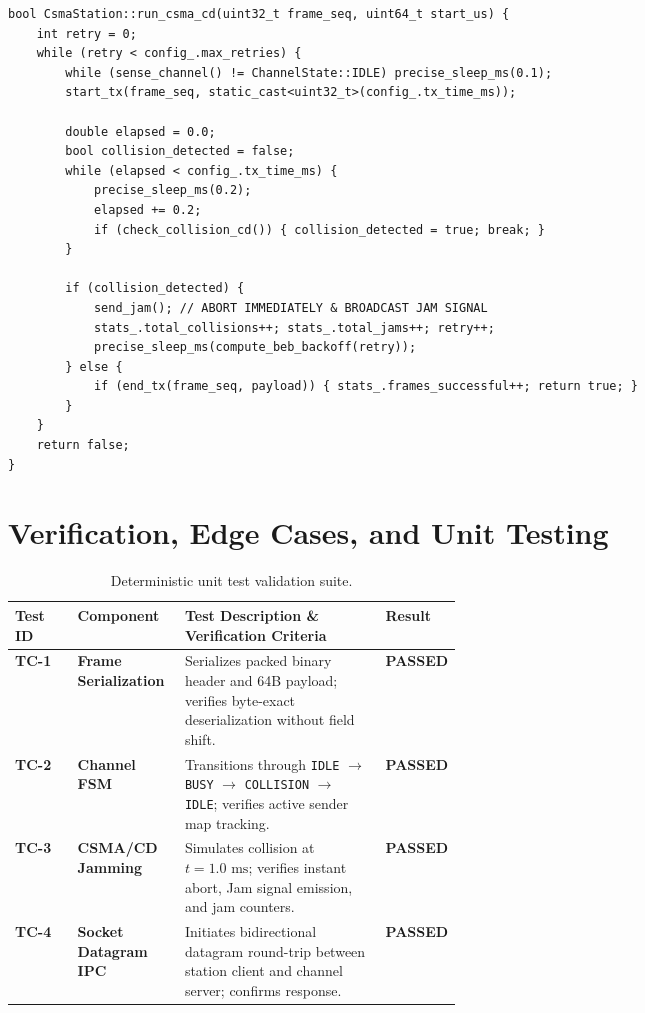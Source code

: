 \documentclass[11pt,a4paper]{article}
\begin{document}
\begin{lstlisting}[caption={CSMA/CD Listen-While-Talk abort, Jamming, and BEB in \texttt{src/csma.cpp}.}]
bool CsmaStation::run_csma_cd(uint32_t frame_seq, uint64_t start_us) {
    int retry = 0;
    while (retry < config_.max_retries) {
        while (sense_channel() != ChannelState::IDLE) precise_sleep_ms(0.1);
        start_tx(frame_seq, static_cast<uint32_t>(config_.tx_time_ms));

        double elapsed = 0.0;
        bool collision_detected = false;
        while (elapsed < config_.tx_time_ms) {
            precise_sleep_ms(0.2);
            elapsed += 0.2;
            if (check_collision_cd()) { collision_detected = true; break; }
        }

        if (collision_detected) {
            send_jam(); // ABORT IMMEDIATELY & BROADCAST JAM SIGNAL
            stats_.total_collisions++; stats_.total_jams++; retry++;
            precise_sleep_ms(compute_beb_backoff(retry));
        } else {
            if (end_tx(frame_seq, payload)) { stats_.frames_successful++; return true; }
        }
    }
    return false;
}
\end{lstlisting}

\newpage

\section{Verification, Edge Cases, and Unit Testing}

\begin{table}[H]
\centering
\small
\begin{tabularx}{\linewidth}{@{}>{\bfseries}p{0.14\linewidth} >{\bfseries}p{0.24\linewidth} X >{\centering\arraybackslash}p{0.14\linewidth}@{}}
\toprule
Test ID & Component & Test Description \& Verification Criteria & Result \\
\midrule
TC-1 & Frame Serialization & Serializes packed binary header and 64B payload; verifies byte-exact deserialization without field shift. & \textbf{PASSED} \\
TC-2 & Channel FSM & Transitions through \texttt{IDLE} $\to$ \texttt{BUSY} $\to$ \texttt{COLLISION} $\to$ \texttt{IDLE}; verifies active sender map tracking. & \textbf{PASSED} \\
TC-3 & CSMA/CD Jamming & Simulates collision at $t = 1.0\text{ ms}$; verifies instant abort, Jam signal emission, and jam counters. & \textbf{PASSED} \\
TC-4 & Socket Datagram IPC & Initiates bidirectional datagram round-trip between station client and channel server; confirms response. & \textbf{PASSED} \\
\bottomrule
\end{tabularx}
\caption{Deterministic unit test validation suite.}
\label{tab:testsuite}
\end{table}
\end{document}
